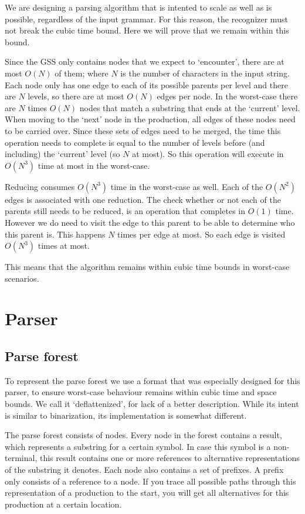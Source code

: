 \documentclass[a4paper,10pt]{article}
\begin{document}
We are designing a parsing algorithm that is intented to scale as well as is possible, regardless of the input grammar. For this reason, the recognizer must not break the cubic time bound. Here we will prove that we remain within this bound.

Since the GSS only contains nodes that we expect to `encounter', there are at most $O(N)$ of them; where $N$ is the number of characters in the input string. Each node only has one edge to each of its possible parents per level and there are $N$ levels, so there are at most $O(N)$ edges per node. In the worst-case there are $N$ times $O(N)$ nodes that match a substring that ends at the `current' level. When moving to the `next' node in the production, all edges of these nodes need to be carried over. Since these sets of edges need to be merged, the time this operation needs to complete is equal to the number of levels before (and including) the `current' level (so $N$ at most). So this operation will execute in $O(N^3)$ time at most in the worst-case.

Reducing consumes $O(N^3)$ time in the worst-case as well. Each of the $O(N^2)$ edges is associated with one reduction. The check whether or not each of the parents still needs to be reduced, is an operation that completes in $O(1)$ time. However we do need to visit the edge to this parent to be able to determine who this parent is. This happens $N$ times per edge at most. So each edge is visited $O(N^3)$ times at most.

This means that the algorithm remains within cubic time bounds in worst-case scenarios.

\section{Parser}

\subsection{Parse forest}

To represent the parse forest we use a format that was especially designed for this parser, to ensure worst-case behaviour remains within cubic time and space bounds. We call it `deflattenized', for lack of a better description. While its intent is similar to binarization, its implementation is somewhat different.

The parse forest consists of nodes. Every node in the forest contains a result, which represents a substring for a certain symbol. In case this symbol is a non-terminal, this result contains one or more references to alternative representations of the substring it denotes. Each node also contains a set of prefixes. A prefix only consists of a reference to a node. If you trace all possible paths through this representation of a production to the start, you will get all alternatives for this production at a certain location.
\end{document}
